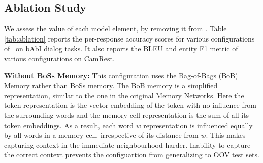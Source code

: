 \subsection{Ablation Study}
\label{sec:expt3}

We assess the value of each model element, by removing it from \sys. Table \ref{tab:ablation} reports the per-response accuracy scores for various configurations of \sys\ on bAbI dialog tasks. It also reports the BLEU and entity F1 metric of various configurations on CamRest.

\noindent \textbf{Without BoSs Memory:} 
This configuration uses the Bag-of-Bags (BoB) Memory rather than {\sc BoSs} memory. The BoB memory is a simplified representation, similar to the one in the original Memory Networks. Here the token representation is the vector embedding of the token with no influence from the surrounding words and the memory cell representation is the sum of all its token embeddings. As a result, each word $w$ representation is influenced equally by all words in a memory cell, irrespective of its distance from $w$. This makes capturing context in the immediate neighbourhood harder. Inability to capture the correct context prevents the configuartion from generalizing to OOV test sets.

